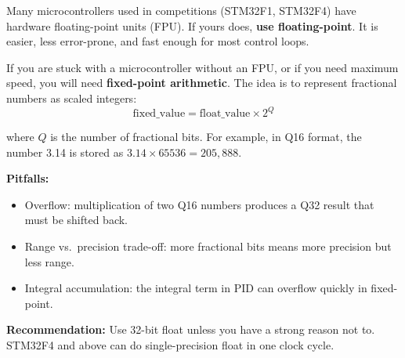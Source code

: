 Many microcontrollers used in competitions (STM32F1, STM32F4) have hardware floating-point units (FPU). If yours does, \textbf{use floating-point}. It is easier, less error-prone, and fast enough for most control loops.

If you are stuck with a microcontroller without an FPU, or if you need maximum speed, you will need \textbf{fixed-point arithmetic}. The idea is to represent fractional numbers as scaled integers:
\begin{equation}
\text{fixed\_value} = \text{float\_value} \times 2^Q
\end{equation}

where $Q$ is the number of fractional bits. For example, in Q16 format, the number 3.14 is stored as $3.14 \times 65536 = 205,888$.

\textbf{Pitfalls:}
\begin{itemize}
    \item Overflow: multiplication of two Q16 numbers produces a Q32 result that must be shifted back.
    \item Range vs.\ precision trade-off: more fractional bits means more precision but less range.
    \item Integral accumulation: the integral term in PID can overflow quickly in fixed-point.
\end{itemize}

\textbf{Recommendation:} Use 32-bit float unless you have a strong reason not to. STM32F4 and above can do single-precision float in one clock cycle.

